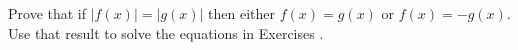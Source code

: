 {\noindent Prove that if $|f(x)| = |g(x)|$ then either $f(x) = g(x)$ or $f(x) = -g(x)$. Use that result to solve the equations in Exercises}
{.}

